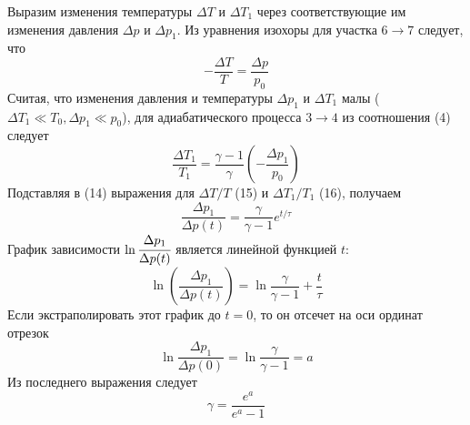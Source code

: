 \documentclass[a4paper,12pt]{article}
\theoremstyle{plain} %
\theoremstyle{definition} %
\theoremstyle{remark} %
\begin{document}
Выразим изменения температуры $\Delta T$ и $\Delta T_1$ через соответствующие им изменения давления $\Delta p$ и $\Delta p_1$. Из уравнения изохоры для участка $6\rightarrow7$ следует, что 
\begin{equation}
-\frac{\Delta T}{T} = \frac{\Delta p}{p_0}
\end{equation}
Считая, что изменения давления и температуры $\Delta p_1$ и $\Delta T_1$ малы ($\Delta T_1 \ll T_0, \Delta p_1 \ll p_0$), для адиабатического процесса $3\rightarrow4$ из соотношения (4) следует 
\begin{equation}
\frac{\Delta T_1}{T_1} = \frac{\gamma - 1}{\gamma}\left(-\frac{\Delta p_1}{p_0}\right)
\end{equation}
Подставляя в (14) выражения для $\Delta T/T$ (15) и $\Delta T_1/T_1$ (16), получаем
\begin{equation}
\frac{\Delta p_1}{\Delta p(t)} = \frac{\gamma}{\gamma -1}e^{t/\tau}
\end{equation}
График зависимости $\ln \cfrac{\Delta p_1}{\Delta p(t)}$ является линейной функцией $t$:
\begin{equation}
\ln\left(\frac{\Delta p_1}{\Delta p(t)}\right) = \ln \frac{\gamma}{\gamma - 1} + \frac{t}{\tau}
\end{equation}
Если экстраполировать этот график до $t = 0$, то он отсечет на оси ординат отрезок 
\[ \ln \frac{\Delta p_1}{\Delta p(0)} = \ln\frac{\gamma}{\gamma - 1} = a\]
Из последнего выражения следует
\begin{equation}
\gamma = \frac{e^a}{e^a-1}
\end{equation}
\end{document}
